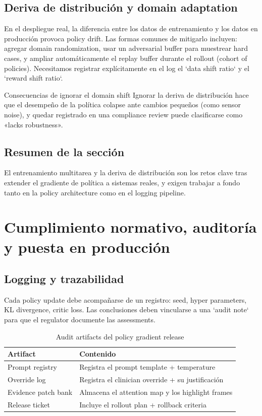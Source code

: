 \documentclass[a4paper]{article}
\begin{document}
\subsection{Deriva de distribución y domain adaptation}
En el despliegue real, la diferencia entre los datos de entrenamiento y los datos en producción provoca policy drift. Las formas comunes de mitigarlo incluyen: agregar domain randomization, usar un adversarial buffer para muestrear hard cases, y ampliar automáticamente el replay buffer durante el rollout (cohort of policies). Necesitamos registrar explícitamente en el log el `data shift ratio` y el `reward shift ratio`.

\begin{warningbox}{Consecuencias de ignorar el domain shift}
Ignorar la deriva de distribución hace que el desempeño de la política colapse ante cambios pequeños (como sensor noise), y quedar registrado en una compliance review puede clasificarse como «lacks robustness».
\end{warningbox}

\subsection{Resumen de la sección}
El entrenamiento multitarea y la deriva de distribución son los retos clave tras extender el gradiente de política a sistemas reales, y exigen trabajar a fondo tanto en la policy architecture como en el logging pipeline.

\section{Cumplimiento normativo, auditoría y puesta en producción}
\subsection{Logging y trazabilidad}
Cada policy update debe acompañarse de un registro: seed, hyper parameters, KL divergence, critic loss. Las conclusiones deben vincularse a una `audit note` para que el regulator documente las assessments.

\begin{table}[H]
\centering
\small
\begin{tabular}{p{}p{}}
\toprule
Artifact & Contenido \\
\midrule
Prompt registry & Registra el prompt template + temperature \\
Override log & Registra el clinician override + su justificación \\
Evidence patch bank & Almacena el attention map y los highlight frames \\
Release ticket & Incluye el rollout plan + rollback criteria \\
\bottomrule
\end{tabular}
\caption{Audit artifacts del policy gradient release}
\end{table}
\end{document}
